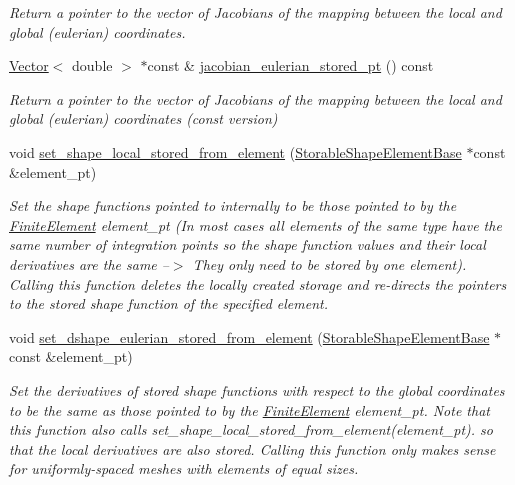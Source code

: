 \begin{DoxyCompactItemize}
\begin{DoxyCompactList}\small\item\em Return a pointer to the vector of Jacobians of the mapping between the local and global (eulerian) coordinates. \end{DoxyCompactList}\item 
\hyperlink{classoomph_1_1Vector}{Vector}$<$ double $>$ $\ast$const  \& \hyperlink{classoomph_1_1StorableShapeElementBase_acfb1a733f32bd7df3f3f44d7e9778ee5}{jacobian\+\_\+eulerian\+\_\+stored\+\_\+pt} () const
\begin{DoxyCompactList}\small\item\em Return a pointer to the vector of Jacobians of the mapping between the local and global (eulerian) coordinates (const version) \end{DoxyCompactList}\item 
void \hyperlink{classoomph_1_1StorableShapeElementBase_aa0f11d26e348ffbf3bef39ee76a43bfb}{set\+\_\+shape\+\_\+local\+\_\+stored\+\_\+from\+\_\+element} (\hyperlink{classoomph_1_1StorableShapeElementBase}{Storable\+Shape\+Element\+Base} $\ast$const \&element\+\_\+pt)
\begin{DoxyCompactList}\small\item\em Set the shape functions pointed to internally to be those pointed to by the \hyperlink{classoomph_1_1FiniteElement}{Finite\+Element} element\+\_\+pt (In most cases all elements of the same type have the same number of integration points so the shape function values and their local derivatives are the same --$>$ They only need to be stored by one element). Calling this function deletes the locally created storage and re-\/directs the pointers to the stored shape function of the specified element. \end{DoxyCompactList}\item 
void \hyperlink{classoomph_1_1StorableShapeElementBase_aab18b96b6ef256e161033ec16e099fa4}{set\+\_\+dshape\+\_\+eulerian\+\_\+stored\+\_\+from\+\_\+element} (\hyperlink{classoomph_1_1StorableShapeElementBase}{Storable\+Shape\+Element\+Base} $\ast$const \&element\+\_\+pt)
\begin{DoxyCompactList}\small\item\em Set the derivatives of stored shape functions with respect to the global coordinates to be the same as those pointed to by the \hyperlink{classoomph_1_1FiniteElement}{Finite\+Element} element\+\_\+pt. Note that this function also calls set\+\_\+shape\+\_\+local\+\_\+stored\+\_\+from\+\_\+element(element\+\_\+pt). so that the local derivatives are also stored. Calling this function only makes sense for uniformly-\/spaced meshes with elements of equal sizes. \end{DoxyCompactList}\item 

\end{DoxyCompactItemize}

